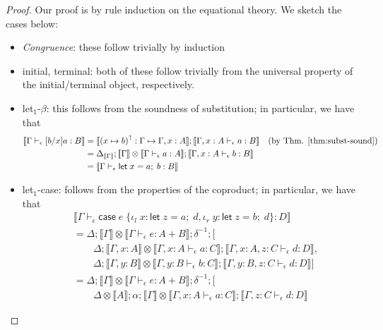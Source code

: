 \documentclass[acmsmall,screen,review]{acmart}
\newcommand{\ms}[1]{\ensuremath{\mathsf{#1}}}
\newcommand{\lto}{:}
\newcommand{\linl}[1]{\iota_l\;{#1}}
\newcommand{\linr}[1]{\iota_r\;{#1}}
\newcommand{\letexpr}[3]{\ensuremath{\ms{let}\;#1 = #2;\;#3}}
\newcommand{\caseexpr}[5]{\ms{case}\;#1\;\{\linl{#2} \lto #3, \linr{#4} \lto #5\}}
\newcommand{\upg}[1]{{#1}^\uparrow}
\newcommand{\bhyp}[2]{#1 : #2}
\newcommand{\hasty}[4]{#1 \vdash_{#2} #3: {#4}}
\newcommand{\issubst}[3]{#1: #2 \mapsto #3}
\newcommand{\brle}[1]{{\scriptsize\textsf{#1}}}
\newcommand{\dnt}[1]{\llbracket{#1}\rrbracket}
\begin{document}
\begin{proof}
  Our proof is by rule induction on the equational theory. We sketch the cases below:
  \begin{itemize}
    \item \emph{Congruence}: these follow trivially by induction
    \item \brle{initial}, \brle{terminal}: both of these follow trivially from the universal
    property of the initial/terminal object, respectively.
    \item \brle{let$_1$-$\beta$}: this follows from the soundness of substitution; in particular, we
    have that
    \begin{align*}
      \dnt{\hasty{\Gamma}{\epsilon}{[b/x]a}{B}}
      &= \dnt{\issubst{\upg{(x \mapsto b)}}{\Gamma}{\Gamma, \bhyp{x}{A}}}
        ; \dnt{\hasty{\Gamma, \bhyp{x}{A}}{\epsilon}{a}{B}}
      \quad \text{(by Thm. \ref{thm:subst-sound})} \\
      &= \Delta_{\dnt{\Gamma}} 
        ; \dnt{\Gamma} \otimes \dnt{\hasty{\Gamma}{\epsilon}{a}{A}} 
        ; \dnt{\hasty{\Gamma, \bhyp{x}{A}}{\epsilon}{b}{B}} \\
      &= \dnt{\hasty{\Gamma}{\epsilon}{\letexpr{x}{a}{b}}{B}}
    \end{align*}
    \item \brle{let$_1$-case}: follows from the properties of the coproduct; in particular, we have
    that
    \begin{align*}
      & \dnt{\hasty{\Gamma}{\epsilon}{\caseexpr{e}{x}{\letexpr{z}{a}{d}}{y}{\letexpr{z}{b}{d}}}{D}}
      \\ &= \Delta ; \dnt{\Gamma} \otimes \dnt{\hasty{\Gamma}{\epsilon}{e}{A + B}} ; \delta^{-1} ; [
      \\ & \qquad \Delta
            ; \dnt{\Gamma, \bhyp{x}{A}} \otimes \dnt{\hasty{\Gamma, \bhyp{x}{A}}{\epsilon}{a}{C}}
            ; \dnt{\hasty{\Gamma, \bhyp{x}{A}, \bhyp{z}{C}}{\epsilon}{d}{D}}
            ,
      \\  & \qquad \Delta
            ; \dnt{\Gamma, \bhyp{y}{B}} \otimes \dnt{\hasty{\Gamma, \bhyp{y}{B}}{\epsilon}{b}{C}}
            ; \dnt{\hasty{\Gamma, \bhyp{y}{B}, \bhyp{z}{C}}{\epsilon}{d}{D}}
        ]
      \\ &= \Delta ; \dnt{\Gamma} \otimes \dnt{\hasty{\Gamma}{\epsilon}{e}{A + B}} ; \delta^{-1} ; [
      \\ & \qquad \Delta \otimes \dnt{A} ; \alpha
            ; \dnt{\Gamma} \otimes \dnt{\hasty{\Gamma, \bhyp{x}{A}}{\epsilon}{a}{C}}
            ; \dnt{\hasty{\Gamma, \bhyp{z}{C}}{\epsilon}{d}{D}}

\end{align*}
\end{itemize}
\end{proof}
\end{document}
